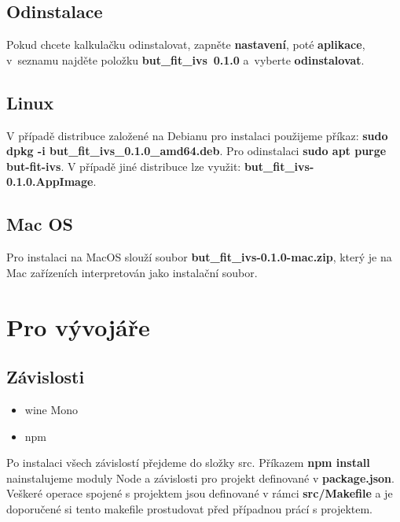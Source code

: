 \documentclass[12pt,czech]{article}
\begin{document}
\subsection{Odinstalace}
Pokud chcete kalkulačku odinstalovat, zapněte \textbf{nastavení}, poté \textbf{aplikace}, v~seznamu najděte položku \textbf{but\_fit\_ivs~0.1.0} a~vyberte \textbf{odinstalovat}.
\begin{figure}[h]
\centering
{}
\end{figure}

\newpage
\subsection{Linux}
V případě distribuce založené na Debianu pro instalaci \newline
použijeme příkaz: \textbf{sudo dpkg -i but\_fit\_ivs\_0.1.0\_amd64.deb}. \newline
Pro odinstalaci \textbf{sudo apt purge but-fit-ivs}.\newline
V případě jiné distribuce lze využit: \textbf{but\_fit\_ivs-0.1.0.AppImage}.


\subsection{Mac OS}
Pro instalaci na MacOS slouží soubor \textbf{but\_fit\_ivs-0.1.0-mac.zip}, který je na Mac zařízeních interpretován jako instalační soubor.

\newpage
\section{Pro vývojáře}
\subsection{Závislosti}
\begin{itemize}
    \item{wine Mono}
    \item{npm}
\end{itemize}
Po instalaci všech závislostí přejdeme do složky src. Příkazem \textbf{npm install} nainstalujeme moduly Node a závislosti pro projekt definované v \textbf{package.json}. Veškeré operace spojené s projektem jsou definované v rámci \textbf{src/Makefile} a je doporučené si tento makefile prostudovat před případnou prácí s projektem.
\end{document}
